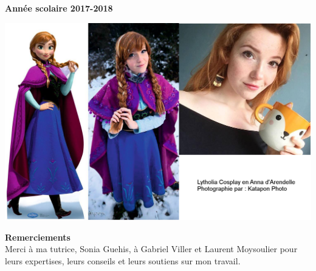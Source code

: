 \documentclass[a4paper,12pt]{article}
\begin{document}
\begin{titlepage}
		\begin{center}
			\vspace{0.1cm} \textbf{Année scolaire 2017-2018}
		\end{center}
		\begin{center}
			\includegraphics[scale=0.2]{images/LytholiaCosplay.png}	
		\end{center}
		
 
\newpage
\thispagestyle{empty}
\begin{flushright}
\textbf{Remerciements} \\
Merci à ma tutrice, Sonia Guehis, à Gabriel Viller et Laurent Moysoulier pour leurs expertises, leurs conseils et leurs soutiens sur mon travail.
\end{flushright}
\newpage
\tableofcontents
\thispagestyle{empty}
\end{titlepage}

\newpage
	


{}
\end{document}

